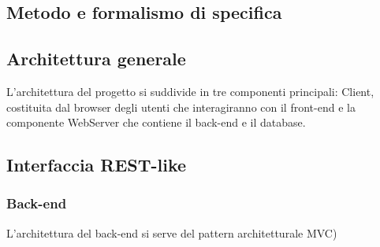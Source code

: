 \subsection{Metodo e formalismo di specifica}

\subsection{Architettura generale}
L'architettura del progetto si suddivide in tre componenti principali: Client, costituita dal browser degli utenti che interagiranno con il front-end e la componente WebServer che contiene il back-end e il database.

\subsection{Interfaccia REST-like}

\subsubsection{Back-end}

L'architettura del back-end si serve del pattern architetturale MVC)
